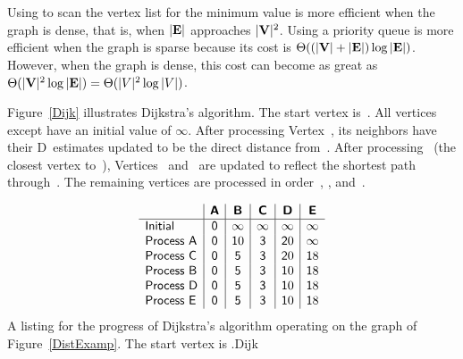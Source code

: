 Using  to scan the vertex list for the minimum value
is more efficient when the graph is dense, that is, when \(|{\textbf{E}}|\)
approaches \(|{\textbf{V}}|^2\).
Using a priority queue is more efficient when the graph is sparse
because its cost is
\(\Theta((|{\textbf{V}}| + |{\textbf{E}}|) \log |{\textbf{E}}|)\).
However, when the graph is dense, this cost can become as great as
\(\Theta(|{\textbf{V}}|^2 \log |{\textbf{E}}|) = \Theta(|V|^2 \log |V|)\).

Figure~\ref{Dijk} illustrates Dijkstra's algorithm.
The start vertex is~.
All vertices except  have an initial value of \(\infty\).
After processing Vertex~, its neighbors have their D~estimates
updated to be the direct distance from~.
After processing~ (the closest vertex to~),
Vertices~ and~ are updated to reflect the shortest
path through~.
The remaining vertices are processed in order~, ,
and~.

\begin{mytable}
\[
\begin{array}
{l|c|c|c|c|c}
& \textsf{\textbf{A}} & \textsf{\textbf{B}} & \textsf{\textbf{C}} &
\textsf{\textbf{D}} & \textsf{\textbf{E}}\\
\hline
\textsf{Initial}   & \mathsf 0 & \mathsf \infty & \mathsf \infty & \mathsf \infty & \mathsf \infty\\
\textsf{Process A} & \mathsf 0 & \mathsf 10 & \mathsf 3 & \mathsf 20 & \mathsf \infty\\
\textsf{Process C} & \mathsf 0 &  \mathsf 5 & \mathsf 3 & \mathsf 20 & \mathsf 18\\
\textsf{Process B} & \mathsf 0 &  \mathsf 5 & \mathsf 3 & \mathsf 10 & \mathsf 18\\
\textsf{Process D} & \mathsf 0 &  \mathsf 5 & \mathsf 3 & \mathsf 10 & \mathsf 18\\
\textsf{Process E} & \mathsf 0 &  \mathsf 5 & \mathsf 3 & \mathsf 10 & \mathsf 18\\
\end{array}
\]
\vspace{-\bigskipamount}\vspace{-\medskipamount}
{A listing for the progress of Dijkstra's algorithm operating on the
graph of Figure~\ref{DistExamp}.
The start vertex is .}{Dijk}
\smallskip
\end{mytable}



